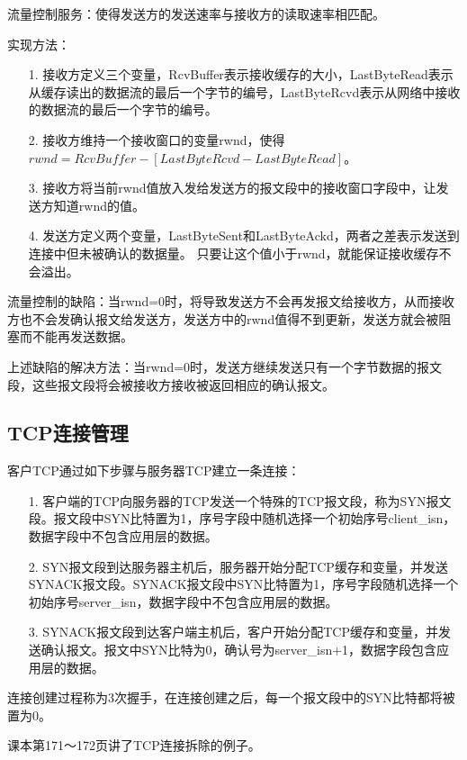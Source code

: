 \documentclass[a4paper,left=2.5cm,right=2.5cm,11pt]{article}
\begin{document}
	流量控制服务：使得发送方的发送速率与接收方的读取速率相匹配。\par

	实现方法：
	\begin{itemize}
		\item[1.] 接收方定义三个变量，RcvBuffer表示接收缓存的大小，LastByteRead表示从缓存读出的数据流的最后一个字节的编号，LastByteRcvd表示从网络中接收的数据流的最后一个字节的编号。
		\item[2.] 接收方维持一个接收窗口的变量rwnd，使得$rwnd=RcvBuffer-[LastByteRcvd - LastByteRead]$。
		\item[3.] 接收方将当前rwnd值放入发给发送方的报文段中的接收窗口字段中，让发送方知道rwnd的值。
		\item[4.] 发送方定义两个变量，LastByteSent和LastByteAckd，两者之差表示发送到连接中但未被确认的数据量。
			      只要让这个值小于rwnd，就能保证接收缓存不会溢出。
	\end{itemize}

	流量控制的缺陷：当rwnd=0时，将导致发送方不会再发报文给接收方，从而接收方也不会发确认报文给发送方，发送方中的rwnd值得不到更新，发送方就会被阻塞而不能再发送数据。\par

	上述缺陷的解决方法：当rwnd=0时，发送方继续发送只有一个字节数据的报文段，这些报文段将会被接收方接收被返回相应的确认报文。

\subsection{TCP连接管理}
	客户TCP通过如下步骤与服务器TCP建立一条连接：
	\begin{itemize}
		\item[1.] 客户端的TCP向服务器的TCP发送一个特殊的TCP报文段，称为SYN报文段。报文段中SYN比特置为1，序号字段中随机选择一个初始序号client\_isn，数据字段中不包含应用层的数据。
		\item[2.] SYN报文段到达服务器主机后，服务器开始分配TCP缓存和变量，并发送SYNACK报文段。SYNACK报文段中SYN比特置为1，序号字段随机选择一个初始序号server\_isn，数据字段中不包含应用层的数据。
		\item[3.] SYNACK报文段到达客户端主机后，客户开始分配TCP缓存和变量，并发送确认报文。报文中SYN比特为0，确认号为server\_isn+1，数据字段包含应用层的数据。
	\end{itemize}

	连接创建过程称为3次握手，在连接创建之后，每一个报文段中的SYN比特都将被置为0。\par

	课本第171～172页讲了TCP连接拆除的例子。\par
\end{document}
